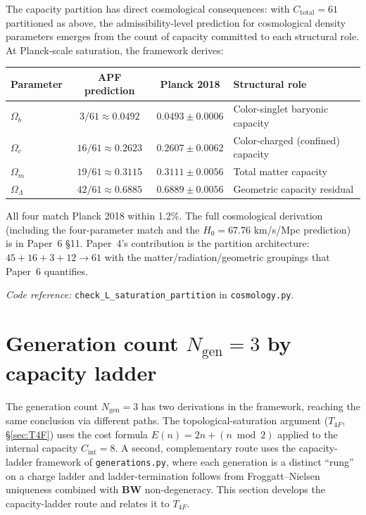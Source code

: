 \documentclass[11pt]{article}
\newcommand{\coderef}[2]{\smallskip\noindent\textit{Code reference:} \texttt{#1} in \texttt{#2}.}
\newcommand{\BW}{\textbf{BW}}
\theoremstyle{definition}
\begin{document}
The capacity partition has direct cosmological consequences: with $C_{\mathrm{total}} = 61$ partitioned as above, the admissibility-level prediction for cosmological density parameters emerges from the count of capacity committed to each structural role. At Planck-scale saturation, the framework derives:

\begin{center}\small
\begin{tabular}{@{}l c c l@{}}
\toprule
\textbf{Parameter} & \textbf{APF prediction} & \textbf{Planck 2018} & \textbf{Structural role} \\
\midrule
$\Omega_b$         & $3/61 \approx 0.0492$  & $0.0493 \pm 0.0006$ & Color-singlet baryonic capacity \\
$\Omega_c$         & $16/61 \approx 0.2623$ & $0.2607 \pm 0.0062$ & Color-charged (confined) capacity \\
$\Omega_m$         & $19/61 \approx 0.3115$ & $0.3111 \pm 0.0056$ & Total matter capacity \\
$\Omega_\Lambda$   & $42/61 \approx 0.6885$ & $0.6889 \pm 0.0056$ & Geometric capacity residual \\
\bottomrule
\end{tabular}
\end{center}

All four match Planck 2018 within 1.2\%. The full cosmological derivation (including the four-parameter match and the $H_0 = 67.76$ km/s/Mpc prediction) is in Paper~6 \S11. Paper~4's contribution is the partition architecture: $45 + 16 + 3 + 12 \to 61$ with the matter/radiation/geometric groupings that Paper~6 quantifies.

\coderef{check\_L\_saturation\_partition}{cosmology.py}

\section{Generation count \texorpdfstring{$N_{\mathrm{gen}} = 3$}{Ngen = 3} by capacity ladder}\label{sec:Ngen3_ladder}

The generation count $N_{\mathrm{gen}} = 3$ has two derivations in the framework, reaching the same conclusion via different paths. The topological-saturation argument ($T_{4F}$, \S\ref{sec:T4F}) uses the cost formula $E(n) = 2n + (n \bmod 2)$ applied to the internal capacity $C_{\mathrm{int}} = 8$. A second, complementary route uses the capacity-ladder framework of \texttt{generations.py}, where each generation is a distinct ``rung'' on a charge ladder and ladder-termination follows from Froggatt--Nielsen uniqueness combined with \BW{} non-degeneracy. This section develops the capacity-ladder route and relates it to $T_{4F}$.
\end{document}
